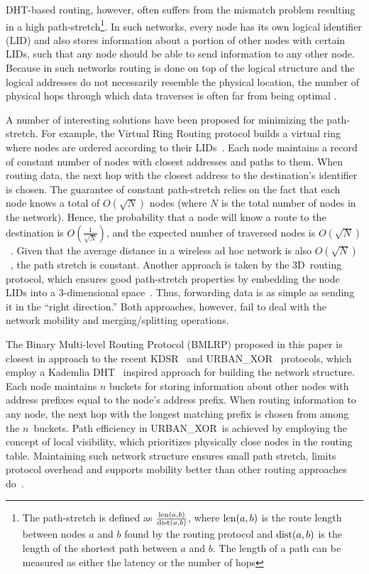 \documentclass[conference]{IEEEtran}
\theoremstyle{definition}
\newcommand{\urbanxor}{URBAN\_XOR}
\begin{document}
DHT-based routing, however, often suffers from the mismatch problem resulting in a high path-stretch\footnote{The path-stretch is defined as $ \frac{{\rm len}(a,b)}{{\rm dist}(a,b)} $, where ${\rm len}(a,b)$ is the route length between nodes $a$ and $b$ found by the routing protocol and ${\rm dist}(a,b)$ is the length of the shortest path between $a$ and $b$. The length of a path can be measured as either the latency or the number of hops}. In such networks, every node has its own logical identifier (LID) and also stores information about a portion of other nodes with certain LIDs, such that any node should be able to send information to any other node. Because in such networks routing is done on top of the logical structure and the logical addresses do not necessarily resemble the physical location, the number of physical hops through which data traverses is often far from being optimal \cite{Abid}.

A number of interesting solutions have been proposed for minimizing the path-stretch. For example, the Virtual Ring Routing protocol builds a virtual ring where nodes are ordered according to their LIDs~\cite{VRR}. Each node maintains a record of constant number of nodes with closest addresses and paths to them. When routing data, the next hop with the closest address to the destination's identifier is chosen. The guarantee of constant path-stretch relies on the fact that each node knows a total of $O(\sqrt{N})$ nodes (where $N$ is the total number of nodes in the network). Hence, the probability that a node will know a route to the destination is $O(\frac{1}{\sqrt{N}})$, and the expected number of traversed nodes is $O(\sqrt{N})$~\cite{VRR}. Given that the average distance in a wireless ad hoc network is also $O(\sqrt{N})$~\cite{Kleinrock}, the path stretch is constant. Another approach is taken by the 3D~routing protocol, which ensures good path-stretch properties by embedding the node LIDs into a 3-dimensional space~\cite{3drp}. Thus, forwarding data is as simple as sending it in the ``right direction.'' Both approaches, however, fail to deal with the network mobility and merging/splitting operations. 

The Binary Multi-level Routing Protocol (BMLRP) proposed in this paper is closest in approach to the recent KDSR~\cite{kdsr} and \urbanxor~\cite{Pasquini} protocols, which employ a Kademlia DHT~\cite{kademlia} inspired approach for building the network structure. Each node maintains $n$ buckets for storing information about other nodes with address prefixes equal to the node's address prefix. When routing information to any node, the next hop with the longest matching prefix is chosen from among the $n$~buckets. Path efficiency in \urbanxor~is achieved by employing the concept of local visibility, which prioritizes physically close nodes in the routing table. Maintaining such network structure ensures small path stretch, limits protocol overhead and supports mobility better than other routing approaches do~\cite{urbanxor}.
\end{document}
